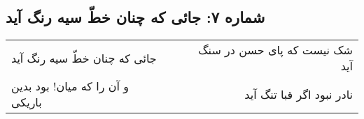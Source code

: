 \begin{center}
\section*{شماره ۷: جائی که چنان خطّ سیه رنگ آید}
\label{sec:007}
\begin{longtable}{l p{0.5cm} r}
جائی که چنان خطّ سیه رنگ آید
&&
شک نیست که پای حسن در سنگ آید
\\
و آن را که میان! بود بدین باریکی
&&
نادر نبود اگر قبا تنگ آید
\\
\end{longtable}
\end{center}
